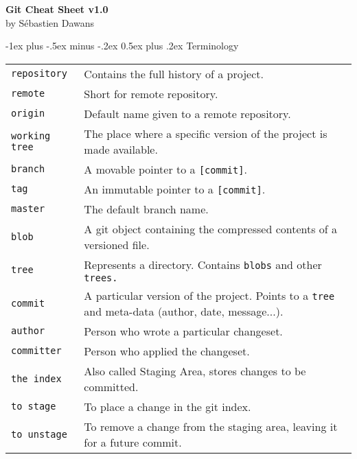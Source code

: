 \documentclass[a4paper,10pt,landscape]{article}
\makeatletter
\renewcommand{\section}{\@startsection{section}{1}{0mm}%
                                {-1ex plus -.5ex minus -.2ex}%
                                {0.5ex plus .2ex}%
                                {\normalfont\large\bfseries}}
\makeatother
\begin{document}
\raggedright
\footnotesize
\begin{multicols}{3}

\newlength{\MyLen}

\setlength{\premulticols}{1pt}
\setlength{\postmulticols}{1pt}
\setlength{\multicolsep}{1pt}
\setlength{\columnsep}{2pt}

\begin{center}
     \Large{\textbf{Git Cheat Sheet v1.0}} \\
     \large{by Sébastien Dawans}
\end{center}

\section{Terminology}
\begin{mdframed}[style=mystyle]
\begin{tabular}{@{}p{\the\MyLen}@{}p{\linewidth-\the\MyLen}@{}}
\verb!repository!         &  Contains the full history of a project.  \\
\verb!remote!              &  Short for remote repository.  \\
\verb!origin!                &  Default name given to a remote repository.  \\
\verb!working tree!     &  The place where a specific version of the project is made available. \\
\verb!branch!              &  A movable pointer to a \texttt{[commit]}. \\
\verb!tag!                   &  An immutable pointer to a \texttt{[commit]}. \\
\verb!master!              &  The default branch name. \\
\verb!blob!                  &  A git object containing the compressed contents of a versioned file. \\
\verb!tree!                  &  Represents a directory. Contains \texttt{blobs} and other \texttt{trees.} \\
\verb!commit!              &  A particular version of the project. Points to a \texttt{tree} and meta-data (author, date, message...). \\
\verb!author!              & Person who wrote a particular changeset. \\
\verb!committer!         & Person who applied the changeset. \\
\verb!the index!          & Also called Staging Area, stores changes to be committed. \\
\verb!to stage!            & To place a change in the git index. \\
\verb!to unstage!        & To remove a change from the staging area, leaving it for a future commit. \\
\end{tabular}
\end{mdframed}



\end{multicols}
\end{document}
